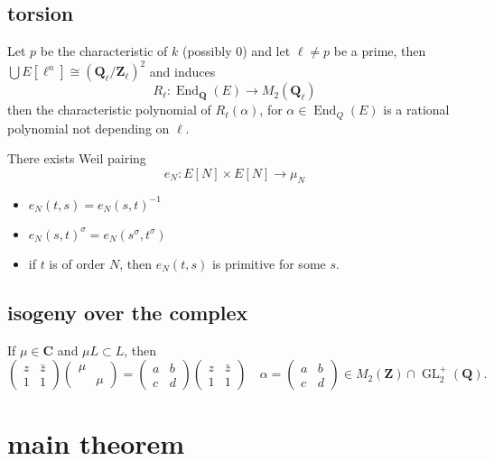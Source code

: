 \documentclass[leqno]{amsart}
\newcommand{\smat}[1]{\left( \begin{smallmatrix} #1 \end{smallmatrix} \right)}
\DeclareMathOperator{\GL}{GL}
\newcommand{\Q}{{\mathbf{Q}}}
\newcommand{\Z}{{\mathbf{Z}}}
\newcommand{\Ql}{\mathbf{Q}_\ell}
\newcommand{\Zl}{\mathbf{Z}_\ell}
\newcommand{\C}{\mathbf C}
\newcommand{\1}{\mathbf{1}}
\DeclareMathOperator{\End}{End}
\theoremstyle{definition}
\theoremstyle{remark}
\begin{document}
\subsection{torsion}

Let $p$ be the characteristic of  $k$ (possibly  $0$)
and let  $\ell\neq p$ be a prime, 
then  $\bigcup E[\ell^n]\cong (\Ql/\Zl)^2$ and induces
 \[
	 R_\ell\colon \End_\Q(E)\to M_2(\Ql)
\]
then the characteristic polynomial of $R_\ell(\alpha)$,
for  $\alpha\in \End_Q(E)$ is a rational polynomial
not depending on  $\ell$.

There exists Weil pairing
\[
	e_N\colon E[N]\times E[N]\to \mu_N
\]
\begin{itemize}
	\item $e_N(t,s)=e_N(s,t)^{-1}$
	\item  $e_N(s,t)^\sigma=e_N(s^\sigma,t^\sigma)$
	\item if  $t$ is of order  $N$, then  $e_N(t,s)$ is primitive
		for some  $s$.
\end{itemize}

\subsection{isogeny over the complex}
If $\mu\in \C$ and  $\mu L\subset L$, then
 \[
	 \smat{z &\bar{z}\\1 & 1}
	 \smat{\mu &\\ & \mu}=
	 \smat{a&b\\c&d}
	 \smat{z &\bar{z}\\1 & 1}\quad
	 \alpha= \smat{a&b\\c&d}\in M_2(\Z)\cap\GL_2^+(\Q).
\]

\section{main theorem}
\end{document}
